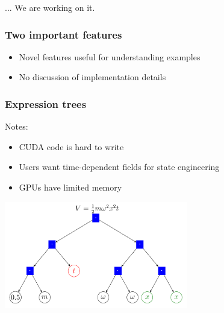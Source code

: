 \documentclass{beamer}
\begin{document}
\begin{frame}

... We are working on it.

\end{frame}


\begin{frame}
\frametitle{Two important features}

\begin{itemize}
\item Novel features useful for understanding examples
\item No discussion of implementation details
\end{itemize}
\end{frame}


\begin{frame}
\frametitle{Expression trees}
Notes:
\begin{itemize}
\item CUDA code is hard to write
\item Users want time-dependent fields for state engineering
\item GPUs have limited memory
\end{itemize}

\pause
\center \includegraphics[width=0.6\textwidth]{expr_tree.png}
\end{frame}
\end{document}
